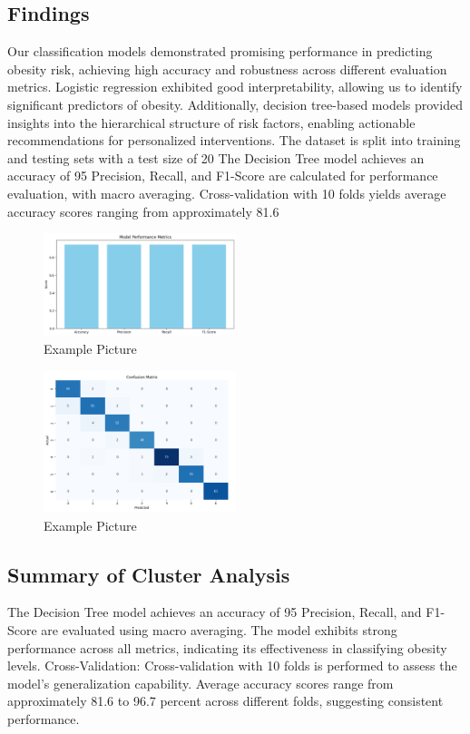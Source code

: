 \documentclass[conference]{IEEEtran}
\begin{document}
\subsection{Findings}\label{AA}
Our classification models demonstrated promising performance in predicting obesity risk, achieving high accuracy and robustness across different evaluation metrics. Logistic regression exhibited good interpretability, allowing us to identify significant predictors of obesity. Additionally, decision tree-based models provided insights into the hierarchical structure of risk factors, enabling actionable recommendations for personalized interventions. The dataset is split into training and testing sets with a test size of 20%
The Decision Tree model achieves an accuracy of 95%
Precision, Recall, and F1-Score are calculated for performance evaluation, with macro averaging.
Cross-validation with 10 folds yields average accuracy scores ranging from approximately 81.6%

\begin{figure}[h]
    \centering
    \includegraphics[width=0.5\textwidth]{classification.png}
    \caption{Example Picture}
    \label{fig:example}
\end{figure}
\begin{figure}[h]
    \centering
    \includegraphics[width=0.5\textwidth]{clasification_conf_matrix.png}
    \caption{Example Picture}
    \label{fig:example}
\end{figure}

\subsection{Summary of Cluster Analysis}
The Decision Tree model achieves an accuracy of 95%
Precision, Recall, and F1-Score are evaluated using macro averaging.
The model exhibits strong performance across all metrics, indicating its effectiveness in classifying obesity levels.
Cross-Validation:
Cross-validation with 10 folds is performed to assess the model's generalization capability.
Average accuracy scores range from approximately 81.6 to 96.7 percent across different folds, suggesting consistent performance.
\end{document}
